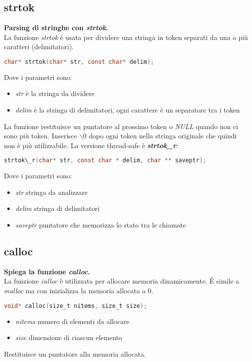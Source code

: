 \documentclass[a4paper,10pt]{article}
\theoremstyle{remark}
\theoremstyle{definition}
\theoremstyle{plain}
\theoremstyle{definition}
\theoremstyle{definition}
\theoremstyle{definition}
\theoremstyle{plain}
\theoremstyle{plain}
\begin{document}
\subsection{strtok}
\textbf{Parsing di stringhe con \textit{strtok}.}\\
La funzione \textit{strtok} è usata per dividere una stringa in token separati da una o più caratteri (delimitatori).
\begin{lstlisting}[language=C]
	char* strtok(char* str, const char* delim);
\end{lstlisting}
Dove i parametri sono:
\begin{itemize}
	\item \textit{str} è la stringa da dividere
	\item \textit{delim} è la stringa di delimitatori, ogni carattere è un separatore tra i token
\end{itemize}
La funzione restituisce un puntatore al prossimo token o \textit{NULL} quando non ci sono più token. Inserisce $\backslash 0$ dopo ogni token nella stringa originale che quindi non è più utilizzabile.
\newpage
\noindent La versione thread-safe è \textbf{\textit{strtok\_r}}:
\begin{lstlisting}[language=C]
	strtok\_r(char* str, const char * delim, char ** saveptr);
\end{lstlisting}
Dove i parametri sono:
\begin{itemize}
	\item \textit{str} stringa da analizzare
	\item \textit{delim} stringa di delimitatori
	\item \textit{saveptr} puntatore che memorizza lo stato tra le chiamate
\end{itemize}
\subsection{calloc}
\textbf{Spiega la funzione \textit{calloc}.}\\
La funzione \textit{calloc} è utilizzata per allocare memoria dinamicamente. È simile a \textit{malloc} ma con inizializza la memoria allocata a $0$.
\begin{lstlisting}[language=C]
		void* calloc(size_t nitems, size_t size);
\end{lstlisting}
\begin{itemize}
	\item \textit{nitems} numero di elementi da allocare
	\item \textit{size} dimensione di ciascun elemento
\end{itemize}
Restituisce un puntatore alla memoria allocata.
\end{document}
